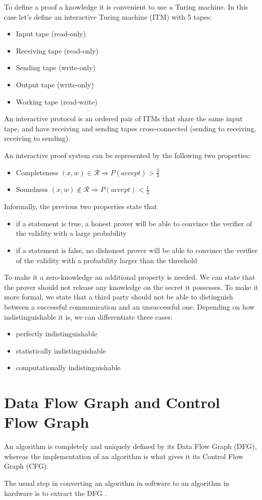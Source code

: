 To define a proof a knowledge it is convenient to use a Turing
machine. In this case let's define an interactive Turing machine (ITM)
with 5 tapes:
\begin{itemize}
\item Input tape (read-only)
\item Receiving tape (read-only)
\item Sending tape (write-only)
\item Output tape (write-only)
\item Working tape (read-write)
\end{itemize}

An interactive protocol is an ordered pair of ITMs that share the same
input tape, and have receiving and sending tapes cross-connected
(sending to receiving, receiving to sending).

An interactive proof system can be represented by the following two
properties:
\begin{itemize}
\item Completeness $(x,w) \in \mathcal{R} \Rightarrow P(accept) > \frac{2}{3}$
\item Soundness $(x,w) \notin \mathcal{R} \Rightarrow P(accept) < \frac{1}{3}$
\end{itemize}

Informally, the previous two properties state that
\begin{itemize}
\item if a statement is true, a honest prover will be able to convince the verifier of the validity with a large probability
\item if a statement is false, no dishonest prover will be able to convince the verifier of the validity with a probability larger than the threshold
\end{itemize}

To make it a zero-knowledge an additional property is needed. We can
state that the prover should not release any knowledge on the secret
it possesses. To make it more formal, we state that a third party
should not be able to distinguish between a successful communication
and an unsuccessful one. Depending on how indistinguishable it is, we
can differentiate three cases:
\begin{itemize}
\item perfectly indistinguishable
\item statistically indistinguishable
\item computationally indistinguishable
\end{itemize}

\section{Data Flow Graph and Control Flow Graph}

An algorithm is completely and uniquely defined by its Data Flow Graph (DFG),
whereas the implementation of an algorithm is what gives it its Control Flow
Graph (CFG).

The usual step in converting an algorithm in software to an algorithm
in hardware is to extract the DFG \cite{Schaumont}.

